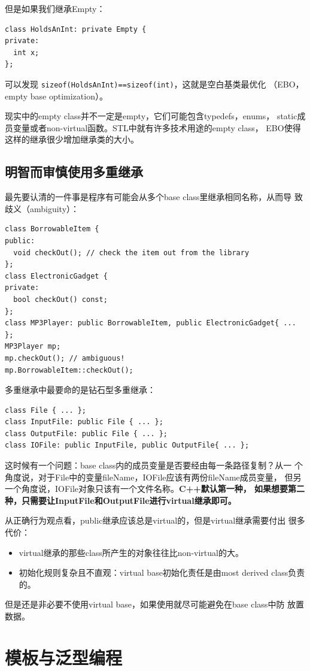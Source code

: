 \documentclass[a4paper,twoside]{article}
\theoremstyle{definition}
\theoremstyle{remark}
\numberwithin{equation}{section}
\let\OldTexttt\texttt
\renewcommand{\texttt}[1]{{\color{blue} \OldTexttt{#1}}}
\begin{document}
但是如果我们继承Empty：
\begin{verbatim}
class HoldsAnInt: private Empty {
private:
  int x;
};
\end{verbatim}
可以发现\texttt{sizeof(HoldsAnInt)==sizeof(int)}，这就是空白基类最优化
（EBO，empty base optimization）。

现实中的empty class并不一定是empty，它们可能包含typedefs，enums，
static成员变量或者non-virtual函数。STL中就有许多技术用途的empty class，
EBO使得这样的继承很少增加继承类的大小。

\subsection{明智而审慎使用多重继承}
\label{sec:Item-40}

最先要认清的一件事是程序有可能会从多个base class里继承相同名称，从而导
致歧义（ambiguity）：
\begin{verbatim}
class BorrowableItem { 
public:
  void checkOut(); // check the item out from the library
};
class ElectronicGadget {
private:
  bool checkOut() const;
};
class MP3Player: public BorrowableItem, public ElectronicGadget{ ... }; 
MP3Player mp;
mp.checkOut(); // ambiguous!
mp.BorrowableItem::checkOut();
\end{verbatim}

多重继承中最要命的是钻石型多重继承：
\begin{verbatim}
class File { ... };
class InputFile: public File { ... };
class OutputFile: public File { ... };
class IOFile: public InputFile, public OutputFile{ ... };
\end{verbatim}
这时候有一个问题：base class内的成员变量是否要经由每一条路径复制？从一
个角度说，对于File中的变量fileName，IOFile应该有两份fileName成员变量，
但另一个角度说，IOFile对象只该有一个文件名称。\textbf{C++默认第一种，
  如果想要第二种，只需要让InputFile和OutputFile进行virtual继承即可。}

从正确行为观点看，public继承应该总是virtual的，但是virtual继承需要付出
很多代价：
\begin{itemize}
\item virtual继承的那些class所产生的对象往往比non-virtual的大。
\item 初始化规则复杂且不直观：virtual base初始化责任是由most derived
  class负责的。
\end{itemize}
但是还是非必要不使用virtual base，如果使用就尽可能避免在base class中防
放置数据。

\clearpage
\section{模板与泛型编程}
\end{document}
